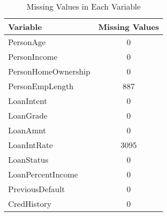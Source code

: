 \begin{table}[H]\centering
\caption{Missing Values in Each Variable}
\label{Table:missing_values}
\begin{tabular}{lc}
\toprule
Variable & Missing Values \\
\midrule
PersonAge & 0 \\
PersonIncome & 0 \\
PersonHomeOwnership & 0 \\
PersonEmpLength & 887 \\
LoanIntent & 0 \\
LoanGrade & 0 \\
LoanAmnt & 0 \\
LoanIntRate & 3095 \\
LoanStatus & 0 \\
LoanPercentIncome & 0 \\
PreviousDefault & 0 \\
CredHistory & 0 \\
\bottomrule
\end{tabular}
\end{table}
